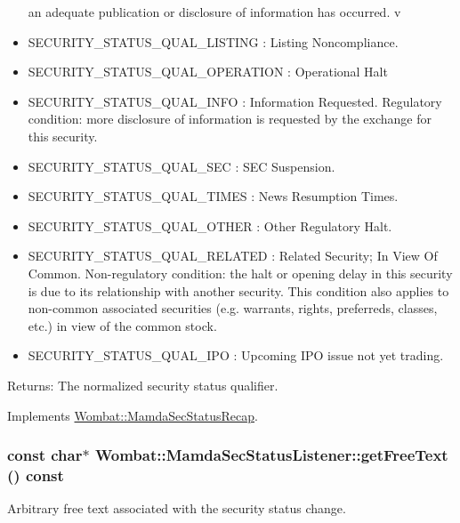 \begin{itemize}
an adequate publication or disclosure of information has occurred. v\item SECURITY\_\-STATUS\_\-QUAL\_\-LISTING : Listing Noncompliance. \item SECURITY\_\-STATUS\_\-QUAL\_\-OPERATION : Operational Halt \item SECURITY\_\-STATUS\_\-QUAL\_\-INFO : Information Requested. Regulatory condition: more disclosure of information is requested by the exchange for this security. \item SECURITY\_\-STATUS\_\-QUAL\_\-SEC : SEC Suspension. \item SECURITY\_\-STATUS\_\-QUAL\_\-TIMES : News Resumption Times. \item SECURITY\_\-STATUS\_\-QUAL\_\-OTHER : Other Regulatory Halt. \item SECURITY\_\-STATUS\_\-QUAL\_\-RELATED : Related Security; In View Of Common. Non-regulatory condition: the halt or opening delay in this security is due to its relationship with another security. This condition also applies to non-common associated securities (e.g. warrants, rights, preferreds, classes, etc.) in view of the common stock. \item SECURITY\_\-STATUS\_\-QUAL\_\-IPO : Upcoming IPO issue not yet trading. \end{itemize}


\begin{Desc}
\item[Returns:]The normalized security status qualifier. \end{Desc}


Implements \hyperlink{classWombat_1_1MamdaSecStatusRecap_3e290ab8d414a7f40d224bdf4518da02}{Wombat::Mamda\-Sec\-Status\-Recap}.\hypertarget{classWombat_1_1MamdaSecStatusListener_cfc40e59afe20f90ea1c0aa616397882}{
\subsubsection[getFreeText]{\setlength{\rightskip}{0pt plus 5cm}const char$\ast$ Wombat::Mamda\-Sec\-Status\-Listener::get\-Free\-Text () const}}
\label{classWombat_1_1MamdaSecStatusListener_cfc40e59afe20f90ea1c0aa616397882}


Arbitrary free text associated with the security status change. 

